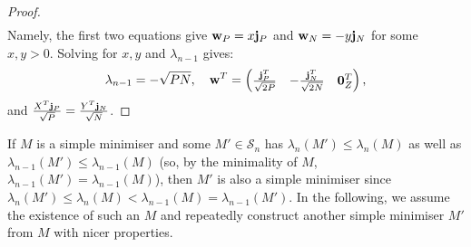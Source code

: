 \documentclass[12pt]{article}
\begin{document}
\begin{proof}
\begin{align*}
    \end{align*}
    Namely, the first two equations give $\bold{w}_P = x\bold{j}_P$ and $\bold{w}_N = -y\bold{j}_N$ for some $x,y>0$. Solving for $x,y$ and $\lambda_{n-1}$ gives:
    \begin{equation*}
        \lambda_{n-1} = -\sqrt{PN},\quad \bold{w}^T = \begin{pmatrix}
            \frac{\bold{j}_P^T}{\sqrt{2P}} & -\frac{\bold{j}_N^T}{\sqrt{2N}} & \bold{0}_{Z}^T
        \end{pmatrix},
    \end{equation*}
    and $\frac{X^{T}\bold{j}_{P}}{\sqrt{P}} = \frac{Y^{T}\bold{j}_{N}}{\sqrt{N}}$. 
\end{proof}

If $M$ is a simple minimiser and some $M'\in \mathcal{S}_n$ has $\lambda_{n}(M')\le \lambda_{n}(M)$ as well as $\lambda_{n-1}(M')\le\lambda_{n-1}(M)$ (so, by the minimality of $M$, $\lambda_{n-1}(M')=\lambda_{n-1}(M)$), then $M'$ is also a simple minimiser since $\lambda_n(M') \le \lambda_n(M) < \lambda_{n-1}(M) = \lambda_{n-1}(M')$. In the following, we assume the existence of such an $M$ and repeatedly construct another simple minimiser $M'$ from $M$ with nicer properties.
\end{document}
